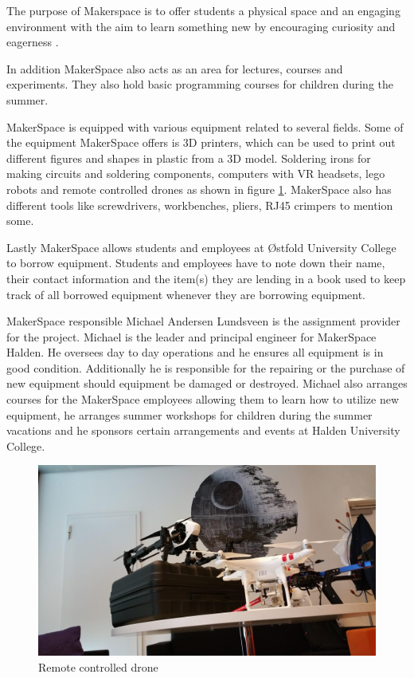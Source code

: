 \begin{displayquote}
The purpose of Makerspace is to offer students a physical space and an engaging environment with the aim to learn something new by encouraging curiosity and eagerness \cite{what-is-makerspace}.
\end{displayquote}
In addition MakerSpace also acts as an area for lectures, courses and experiments.
They also hold basic programming courses for children during the summer.

MakerSpace is equipped with various equipment related to several fields.
Some of the equipment MakerSpace offers is 3D printers, which can be used to print out different figures and shapes in plastic from a 3D model. Soldering irons for making circuits and soldering components, computers with VR headsets, lego robots and remote controlled drones as shown in figure \ref{fig:makerspace}. MakerSpace also has different tools like screwdrivers, workbenches, pliers, RJ45 crimpers to mention some.

Lastly MakerSpace allows students and employees at Østfold University College to borrow equipment.
Students and employees have to note down their name, their contact information and the item(s) they are lending in a book used to keep track of all borrowed equipment whenever they are borrowing equipment.

MakerSpace responsible Michael Andersen Lundsveen is the assignment provider for the project. 
Michael is the leader and principal engineer for MakerSpace Halden.
He oversees day to day operations and he ensures all equipment is in good condition.
Additionally he is responsible for the repairing or the purchase of new equipment should equipment be damaged or destroyed.
Michael also arranges courses for the MakerSpace employees allowing them to learn how to utilize new equipment, he arranges summer workshops for children during the summer vacations and he sponsors certain arrangements and events at Halden University College.

\begin{figure}
    \centering
    \includegraphics[width=115mm,scale=1]{images/makerspace.png}
    \caption{Remote controlled drone}
    \label{fig:makerspace}
\end{figure}

